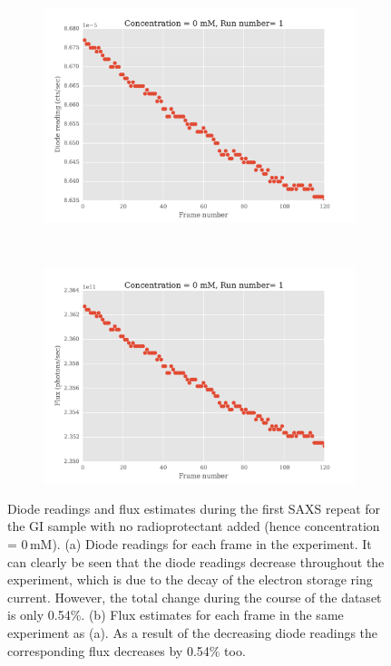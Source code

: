 \begin{figure}
    \centering
    \begin{subfigure}[b]{1.0\textwidth}
            \centering
            \includegraphics[width=\textwidth]{figures/saxs/np_diode_readings.pdf}
            \caption{}
            \label{fig:Diode readings}
    \end{subfigure}
    \\
    \begin{subfigure}[b]{1.0\textwidth}
            \centering
            \includegraphics[width=\textwidth]{figures/saxs/np_flux_estimates.pdf}
            \caption{}
            \label{fig:Flux estimates}
    \end{subfigure}
    \caption[Diode readings and flux estimates during the first SAXS repeat for the 1\,mg/ml GI sample with no radioprotectant added.]{Diode readings and flux estimates during the first SAXS repeat for the GI sample with no radioprotectant added (hence concentration = 0\,mM).
    (a) Diode readings for each frame in the experiment.
    It can clearly be seen that the diode readings decrease throughout the experiment, which is due to the decay of the electron storage ring current.
    However, the total change during the course of the dataset is only 0.54\%.
    (b) Flux estimates for each frame in the same experiment as (a).
    As a result of the decreasing diode readings the corresponding flux decreases by 0.54\% too.}
    \label{fig:Diode and flux readings}
\end{figure}
